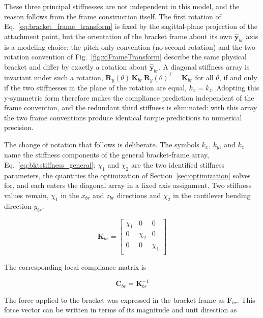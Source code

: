These three principal stiffnesses are not independent in this model, and the reason follows from the frame construction itself. The first rotation of Eq.~\eqref{eq:bracket_frame_transform} is fixed by the sagittal-plane projection of the attachment point, but the orientation of the bracket frame about its own $\hat{\mathbf{y}}_{br}$ axis is a modeling choice: the pitch-only convention (no second rotation) and the two-rotation convention of Fig.~\ref{fig:xiFrameTransform} describe the same physical bracket and differ by exactly a rotation about $\hat{\mathbf{y}}_{br}$. A diagonal stiffness array is invariant under such a rotation, $\mathbf{R}_{y}(\theta)\,\mathbf{K}_{br}\,\mathbf{R}_{y}(\theta)^{T} = \mathbf{K}_{br}$ for all $\theta$, if and only if the two stiffnesses in the plane of the rotation are equal, $k_{x} = k_{z}$. Adopting this y-symmetric form therefore makes the compliance prediction independent of the frame convention, and the redundant third stiffness is eliminated: with this array the two frame conventions produce identical torque predictions to numerical precision.

The change of notation that follows is deliberate. The symbols $k_{x}$, $k_{y}$, and $k_{z}$ name the stiffness components of the general bracket-frame array, Eq.~\eqref{eq:bktstiffness_general}; $\chi_{1}$ and $\chi_{2}$ are the two identified stiffness parameters, the quantities the optimization of Section~\ref{sec:optimization} solves for, and each enters the diagonal array in a fixed axis assignment. Two stiffness values remain, $\chi_{1}$ in the $x_{br}$ and $z_{br}$ directions and $\chi_{2}$ in the cantilever bending direction $y_{br}$:

\begin{equation}
\mathbf{K}_{br} = 
\begin{bmatrix}
\chi_{1} & 0   & 0 \\
0   & \chi_{2} & 0 \\
0   & 0   & \chi_{1} \\
\end{bmatrix}
\label{eq:bktstiffness}
\end{equation}

The corresponding local compliance matrix is 

\begin{equation}
\mathbf{C}_{br} = \mathbf{K}_{br}^{-1}
\label{eq:bktcompliance}
\end{equation}

The force applied to the bracket was expressed in the bracket frame as $\mathbf{F}_{br}$. This force vector can be written in terms of its magnitude and unit direction as

